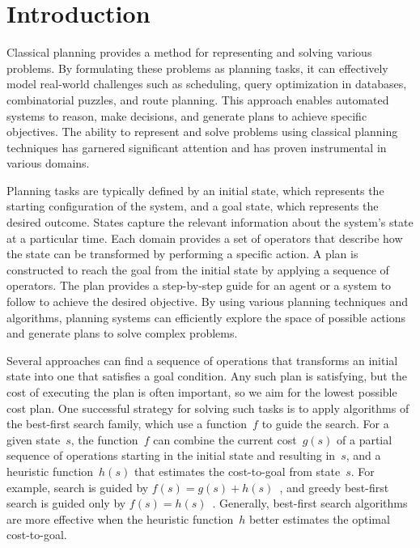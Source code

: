 \chapter{Introduction}
\label{sec:intro}

Classical planning provides a method for representing and solving various problems. By formulating these problems as planning tasks, it can effectively model real-world challenges such as scheduling, query optimization in databases, combinatorial puzzles, and route planning. This approach enables automated systems to reason, make decisions, and generate plans to achieve specific objectives. The ability to represent and solve problems using classical planning techniques has garnered significant attention and has proven instrumental in various domains.

Planning tasks are typically defined by an initial state, which represents the starting configuration of the system, and a goal state, which represents the desired outcome. States capture the relevant information about the system's state at a particular time. Each domain provides a set of operators that describe how the state can be transformed by performing a specific action. A plan is constructed to reach the goal from the initial state by applying a sequence of operators. The plan provides a step-by-step guide for an agent or a system to follow to achieve the desired objective. By using various planning techniques and algorithms, planning systems can efficiently explore the space of possible actions and generate plans to solve complex problems.

Several approaches can find a sequence of operations that transforms an initial state into one that satisfies a goal condition. Any such plan is satisfying, but the cost of executing the plan is often important, so we aim for the lowest possible cost plan. One successful strategy for solving such tasks is to apply algorithms of the best-first search family, which use a function~$f$ to guide the search. For a given state~$s$, the function~$f$ can combine the current cost~$g(s)$ of a partial sequence of operations starting in the initial state and resulting in~$s$, and a heuristic function~$h(s)$ that estimates the cost-to-goal from state~$s$. For example, \astar search is guided by $f(s)=g(s)+h(s)$~\cite{hart-et-al-ieeessc1968}, and greedy best-first search is guided only by $f(s)=h(s)$~\cite{doran-michie-rsl1966}. Generally, best-first search algorithms are more effective when the heuristic function~$h$ better estimates the optimal cost-to-goal.

